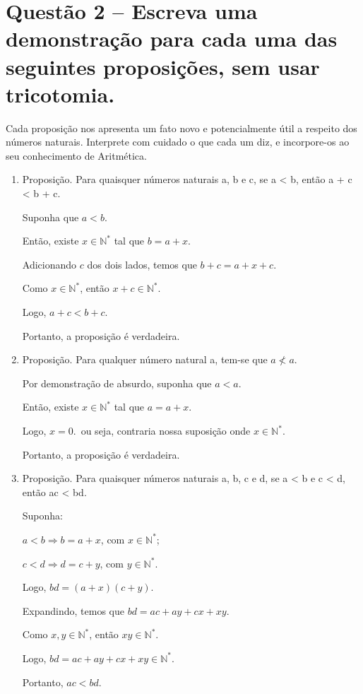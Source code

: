 \documentclass[12pt,a4paper]{article}
\begin{document}
\section*{Questão 2 -- Escreva uma demonstração para cada uma das seguintes proposições, sem usar tricotomia.}

    Cada proposição nos apresenta um fato novo e potencialmente útil a respeito dos números naturais.
    Interprete com cuidado o que cada um diz, e incorpore-os ao seu conhecimento de Aritmética.

    \begin{enumerate}[label= (\alph*)]
        \item Proposição. Para quaisquer números naturais a, b e c, se a < b, então a + c < b + c.
        
        Suponha que $a < b$.

        Então, existe $x \in \mathbb{N}^*$ tal que $b=a+x$.

        Adicionando $c$ dos dois lados, temos que $b+c=a+x+c$.

        Como $x \in \mathbb{N}^*$, então $x+c \in \mathbb{N}^*$.

        Logo, $a+c < b+c$.

        Portanto, a proposição é verdadeira.

        \item Proposição. Para qualquer número natural a, tem-se que $a \nless a$.
        
        Por demonstração de absurdo, suponha que $a < a$.

        Então, existe $x \in \mathbb{N}^*$ tal que $a=a+x$.

        Logo, $x=0$.\ ou seja, contraria nossa suposição onde $x \in \mathbb{N}^*$.

        Portanto, a proposição é verdadeira.

        \item Proposição. Para quaisquer números naturais a, b, c e d, se a < b e c < d, então ac < bd.
        
        Suponha:

        $a<b\Rightarrow b=a+x$, com $x\in\mathbb{N}^*$;

        $c<d\Rightarrow d=c+y$, com $y\in\mathbb{N}^*$.

        Logo, $bd=(a+x)(c+y)$.

        Expandindo, temos que $bd=ac+ay+cx+xy$.

        Como $x,y\in\mathbb{N}^*$, então $xy\in\mathbb{N}^*$.

        Logo, $bd=ac+ay+cx+xy\in\mathbb{N}^*$.

        Portanto, $ac<bd$.
    \end{enumerate}
\end{document}
